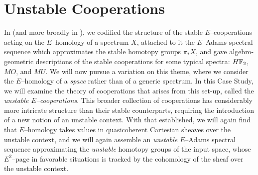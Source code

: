 
\chapter{Unstable Cooperations}\label{UnstableCooperationsChapter}


In  (and more broadly in ), we codified the structure of the stable \(E\)--cooperations acting on the \(E\)--homology of a spectrum \(X\), attached to it the \(E\)--Adams spectral sequence which approximates the stable homotopy groups \(\pi_* X\), and gave algebro-geometric descriptions of the stable cooperations for some typical spectra: \(\HFtwo\), \(MO\), and \(MU\).  We will now pursue a variation on this theme, where we consider the \(E\)--homology of a \emph{space} rather than of a generic spectrum.  In this Case Study, we will examine the theory of cooperations that arises from this set-up, called the \textit{unstable \(E\)--cooperations}.  This broader collection of cooperations has considerably more intricate structure than their stable counterparts, requiring the introduction of a new notion of an unstable context.  With that established, we will again find that \(E\)--homology takes values in quasicoherent Cartesian sheaves over the unstable context, and we will again assemble an \emph{unstable} \(E\)--Adams spectral sequence approximating the \emph{unstable} homotopy groups of the input space, whose \(E^2\)--page in favorable situations is tracked by the cohomology of the sheaf over the unstable context.

